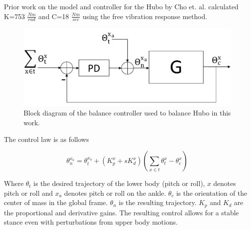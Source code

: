 Prior work on the model and controller for the Hubo by Cho et. al. calculated K=753 $\frac{Nm}{rad}$ and C=18 $\frac{Nm}{sec}$ using the free vibration response method\cite{5379574}.


\begin{figure}[ht]
  \centering
\includegraphics[width=0.8\columnwidth]{./pix/blockDiagram3.pdf}
  \caption{Block diagram of the balance controller used to balance Hubo in this work.}
  \label{fig:ctrlBlockDiagram}
\end{figure}

The control law is as follows

\begin{equation}
\theta_n^{x_a} = \theta_t^{x_a} + \left(K_p^x+sK_d^x\right)\left(\sum\limits_{x \in t} \theta_{t}^x - \theta_{c}^x\right)
\end{equation}

Where $\theta_t$ is the desired trajectory of the lower body (pitch or roll), $x$ denotes pitch or roll and $x_a$ denotes pitch or roll on the ankle.  $\theta_{c}$ is the orientation of the center of mass in the global frame.  $\theta_n$ is the resulting trajectory.  $K_p$ and $K_d$ are the proportional and derivative gains.  The resulting control allows for a stable stance even with perturbations from upper body motions.
